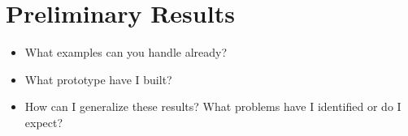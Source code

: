 \section{Preliminary Results}
\begin{itemize}
    \item What examples can you handle already?
    \item What prototype have I built?
    \item How can I generalize these results? What problems have I identified or do I expect?
\end{itemize}

